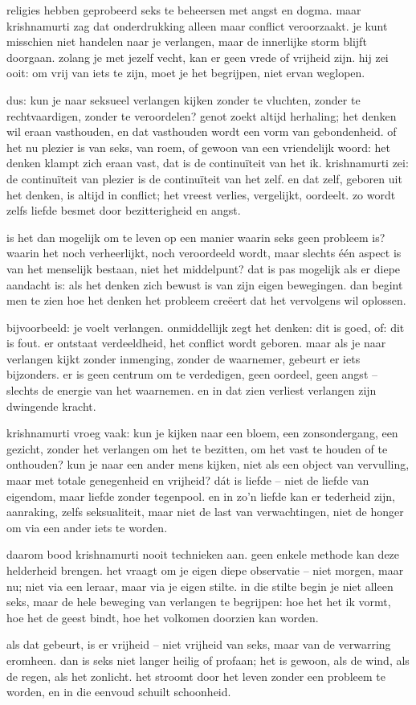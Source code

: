 religies hebben geprobeerd seks te beheersen met angst en dogma. maar krishnamurti zag dat onderdrukking alleen maar conflict veroorzaakt. je kunt misschien niet handelen naar je verlangen, maar de innerlijke storm blijft doorgaan. zolang je met jezelf vecht, kan er geen vrede of vrijheid zijn. hij zei ooit: om vrij van iets te zijn, moet je het begrijpen, niet ervan weglopen.

dus: kun je naar seksueel verlangen kijken zonder te vluchten, zonder te rechtvaardigen, zonder te veroordelen? genot zoekt altijd herhaling; het denken wil eraan vasthouden, en dat vasthouden wordt een vorm van gebondenheid. of het nu plezier is van seks, van roem, of gewoon van een vriendelijk woord: het denken klampt zich eraan vast, dat is de continuïteit van het ik. krishnamurti zei: de continuïteit van plezier is de continuïteit van het zelf. en dat zelf, geboren uit het denken, is altijd in conflict; het vreest verlies, vergelijkt, oordeelt. zo wordt zelfs liefde besmet door bezitterigheid en angst.

is het dan mogelijk om te leven op een manier waarin seks geen probleem is? waarin het noch verheerlijkt, noch veroordeeld wordt, maar slechts één aspect is van het menselijk bestaan, niet het middelpunt? dat is pas mogelijk als er diepe aandacht is: als het denken zich bewust is van zijn eigen bewegingen. dan begint men te zien hoe het denken het probleem creëert dat het vervolgens wil oplossen.

bijvoorbeeld: je voelt verlangen. onmiddellijk zegt het denken: dit is goed, of: dit is fout. er ontstaat verdeeldheid, het conflict wordt geboren. maar als je naar verlangen kijkt zonder inmenging, zonder de waarnemer, gebeurt er iets bijzonders. er is geen centrum om te verdedigen, geen oordeel, geen angst – slechts de energie van het waarnemen. en in dat zien verliest verlangen zijn dwingende kracht.

krishnamurti vroeg vaak: kun je kijken naar een bloem, een zonsondergang, een gezicht, zonder het verlangen om het te bezitten, om het vast te houden of te onthouden? kun je naar een ander mens kijken, niet als een object van vervulling, maar met totale genegenheid en vrijheid? dát is liefde – niet de liefde van eigendom, maar liefde zonder tegenpool. en in zo’n liefde kan er tederheid zijn, aanraking, zelfs seksualiteit, maar niet de last van verwachtingen, niet de honger om via een ander iets te worden.

daarom bood krishnamurti nooit technieken aan. geen enkele methode kan deze helderheid brengen. het vraagt om je eigen diepe observatie – niet morgen, maar nu; niet via een leraar, maar via je eigen stilte. in die stilte begin je niet alleen seks, maar de hele beweging van verlangen te begrijpen: hoe het het ik vormt, hoe het de geest bindt, hoe het volkomen doorzien kan worden.

als dat gebeurt, is er vrijheid – niet vrijheid van seks, maar van de verwarring eromheen. dan is seks niet langer heilig of profaan; het is gewoon, als de wind, als de regen, als het zonlicht. het stroomt door het leven zonder een probleem te worden, en in die eenvoud schuilt schoonheid.
